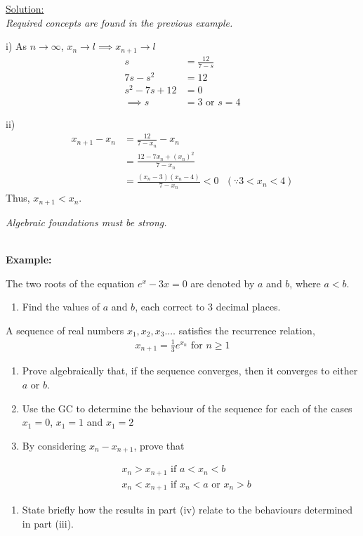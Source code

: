 \documentclass[12pt, a4paper, titlepage]{article}
\begin{document}
\begin{flushright}
\end{flushright}

\underline{Solution:} \\
\emph{Required concepts are found in the previous example.}

i)
As $n \rightarrow \infty$, $x_n \rightarrow l \implies x_{n + 1} \rightarrow l$
\begin{align*}
    s &= \frac{12}{7 - s} \\
    7s - s^2 &= 12 \\
    s^2 - 7s + 12 &= 0 \\
    \implies s &= 3 \text{ or } s = 4
\end{align*}

ii)
\begin{align*}
    x_{n + 1} - x_n &= \frac{12}{7 - x_n} - x_n \\
    &= \frac{12 - 7x_n + (x_n)^2}{7 - x_n} \\
    &= \frac{(x_n - 3)(x_n - 4)}{7 - x_n} < 0 \text{ } (\because 3 < x_n < 4)
\end{align*}
Thus, $x_{n + 1} < x_n$.

\emph{Algebraic foundations must be strong.}

\textbf{\\ Example:}

The two roots of the equation $e^x - 3x = 0$ are denoted by $a$ and $b$, where $a < b$.
\begin{enumerate}[label=(\roman*)]
    \item Find the values of $a$ and $b$, each correct to 3 decimal places.
\end{enumerate}
A sequence of real numbers $x_1, x_2, x_3. \dots $ satisfies the recurrence relation,
\begin{align*}
    x_{n + 1} = \frac{1}{3}e^{x_n} \text{ for } n \ge 1
\end{align*}
\begin{enumerate}[resume, label=(\roman*)]
    \item Prove algebraically that, if the sequence converges, then it converges to either $a$ or $b$.
    \item Use the GC to determine the behaviour of the sequence for each of the cases $x_1 = 0$, $x_1 = 1$ and $x_1 = 2$
    \item By considering $x_n - x_{n + 1}$, prove that
\end{enumerate}
\begin{align*}
    &x_n > x_{n + 1} \text{ if } a < x_n < b \\
    &x_n < x_{n + 1} \text{ if } x_n < a \text{ or } x_n > b
\end{align*}
\begin{enumerate}[resume, label=(\roman*)]
    \item State briefly how the results in part (iv) relate to the behaviours determined in part (iii).
\end{enumerate}
\end{document}
